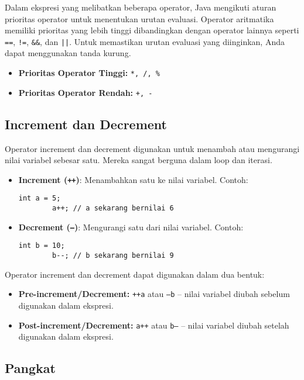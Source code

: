Dalam ekspresi yang melibatkan beberapa operator, Java mengikuti aturan prioritas operator untuk menentukan urutan evaluasi. Operator aritmatika memiliki prioritas yang lebih tinggi dibandingkan dengan operator lainnya seperti \texttt{==}, \texttt{!=}, \texttt{\&\&}, dan \texttt{||}. Untuk memastikan urutan evaluasi yang diinginkan, Anda dapat menggunakan tanda kurung.

\begin{itemize}
	\item \textbf{Prioritas Operator Tinggi:} \texttt{*, /, \%}
	\item \textbf{Prioritas Operator Rendah:} \texttt{+, -}
\end{itemize}

\subsection{Increment dan Decrement}

Operator increment dan decrement digunakan untuk menambah atau mengurangi nilai variabel sebesar satu. Mereka sangat berguna dalam loop dan iterasi.

\begin{itemize}
	\item \textbf{Increment (\texttt{++})}: Menambahkan satu ke nilai variabel. Contoh:
	\begin{lstlisting}[style=JavaStyle]
		int a = 5;
		a++; // a sekarang bernilai 6
	\end{lstlisting}
	\item \textbf{Decrement (\texttt{--})}: Mengurangi satu dari nilai variabel. Contoh:
	\begin{lstlisting}[style=JavaStyle]
		int b = 10;
		b--; // b sekarang bernilai 9
	\end{lstlisting}
\end{itemize}

Operator increment dan decrement dapat digunakan dalam dua bentuk:
\begin{itemize}
	\item \textbf{Pre-increment/Decrement:} \texttt{++a} atau \texttt{--b} – nilai variabel diubah sebelum digunakan dalam ekspresi.
	\item \textbf{Post-increment/Decrement:} \texttt{a++} atau \texttt{b--} – nilai variabel diubah setelah digunakan dalam ekspresi.
\end{itemize}

\subsection{Pangkat}

